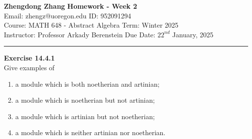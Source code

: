 \documentclass[a4paper, 12pt]{article}
\newenvironment{problem}[2][Exercise]
    { \begin{mdframed}[backgroundcolor=gray!20] \textbf{#1 #2} \\}
    {  \end{mdframed}}
\begin{document}
\noindent
\large\textbf{Zhengdong Zhang} \hfill \textbf{Homework - Week 2}   \\
Email: zhengz@uoregon.edu \hfill ID: 952091294 \\
\normalsize Course: MATH 648 - Abstract Algebra  \hfill Term: Winter 2025\\
Instructor: Professor Arkady Berenstein \hfill Due Date: $22^{nd}$ January, 2025 \\
\noindent\rule{7in}{2.8pt}
\begin{problem}{14.4.1}
Give examples of 
\begin{enumerate}[(1)]
\item a module which is both noetherian and artinian;
\item a module which is noetherian but not artinian;
\item a module which is artinian but not noetherian;
\item a module which is neither artinian nor noetherian.
\end{enumerate}
\end{problem}
\end{document}
